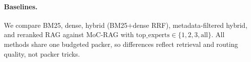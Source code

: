 \paragraph{Baselines.} We compare BM25, dense, hybrid (BM25$+$dense RRF),
metadata-filtered hybrid, and reranked RAG against MoC-RAG with
$\mathrm{top\_experts}\in\{1,2,3,\mathrm{all}\}$. All methods share one budgeted
packer, so differences reflect retrieval and routing quality, not packer tricks.
